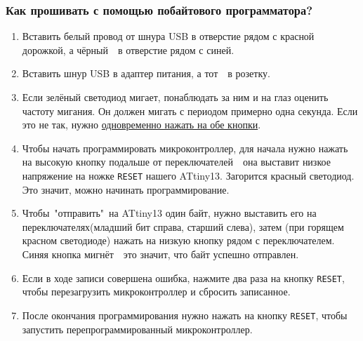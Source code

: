 \documentclass[aspectratio=169, pdf, 8pt, unicode]{beamer}
\begin{document}
\begin{frame}[fragile]
\frametitle{Как прошивать с помощью побайтового программатора?}

	\begin{enumerate}
		\item Вставить белый провод от шнура USB в отверстие рядом с красной дорожкой, а чёрный\ \cyrdash\ в отверстие
			рядом с синей.
		\item Вставить шнур USB в адаптер питания, а тот\ \cyrdash\ в розетку.
		\item Если зелёный светодиод мигает, понаблюдать за ним и на глаз оценить частоту мигания. Он должен мигать
			с периодом примерно одна секунда. Если это не так, нужно \underline{одновременно нажать на обе кнопки}.
		\item Чтобы начать программировать  микроконтроллер, для начала нужно нажать на высокую кнопку подальше
			от переключателей\ \cyrdash\ она выставит низкое напряжение на ножке \texttt{RESET} нашего ATtiny13.
			Загорится красный светодиод. Это значит, можно начинать программирование.
		\item Чтобы\ "отправить"\ на ATtiny13 один байт, нужно выставить его на переключателях(младший бит справа,
			старший слева), затем (при горящем красном светодиоде) нажать на низкую кнопку рядом с переключателем.
			Синяя кнопка мигнёт\ \cyrdash\ это значит, что байт успешно отправлен.
		\item Если в ходе записи совершена ошибка, нажмите два раза на кнопку \texttt{RESET}, чтобы перезагрузить
			микроконтроллер и сбросить записанное.
		\item После окончания программирования нужно нажать на кнопку \texttt{RESET}, чтобы запустить
			перепрограммированный микроконтроллер.
	\end{enumerate}
\end{frame}
\end{document}
